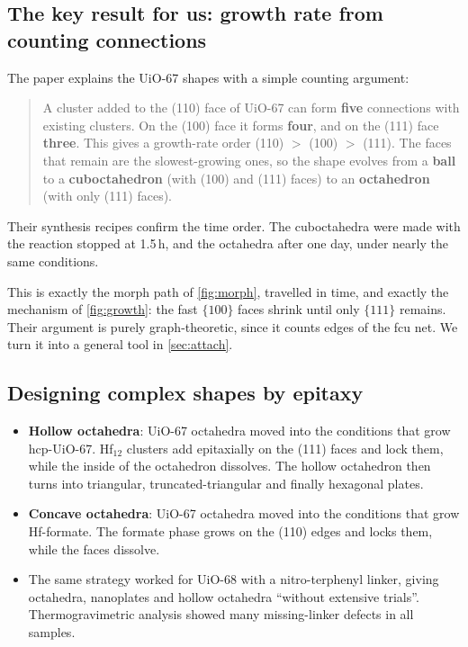 \documentclass[11pt,a4paper]{article}
\theoremstyle{remark}\newtheorem*{example}{Worked example}
\begin{document}
\subsection{The key result for us: growth rate from counting connections}
The paper explains the UiO-67 shapes with a simple counting argument:
\begin{quote}
A cluster added to the (110) face of UiO-67 can form \textbf{five} connections with existing clusters. On the (100) face it forms \textbf{four}, and on the (111) face \textbf{three}. This gives a growth-rate order (110) $>$ (100) $>$ (111). The faces that remain are the slowest-growing ones, so the shape evolves from a \textbf{ball} to a \textbf{cuboctahedron} (with (100) and (111) faces) to an \textbf{octahedron} (with only (111) faces).
\end{quote}
Their synthesis recipes confirm the time order. The cuboctahedra were made with the reaction stopped at 1.5\,h, and the octahedra after one day, under nearly the same conditions.

\begin{forus}
This is exactly the morph path of \autoref{fig:morph}, travelled in time, and exactly the mechanism of \autoref{fig:growth}: the fast $\{100\}$ faces shrink until only $\{111\}$ remains. Their argument is purely graph-theoretic, since it counts edges of the fcu net. We turn it into a general tool in \autoref{sec:attach}.
\end{forus}

\subsection{Designing complex shapes by epitaxy}
\begin{itemize}
\item \textbf{Hollow octahedra}: UiO-67 octahedra moved into the conditions that grow hcp-UiO-67. Hf$_{12}$ clusters add epitaxially on the (111) faces and lock them, while the inside of the octahedron dissolves. The hollow octahedron then turns into triangular, truncated-triangular and finally hexagonal plates.
\item \textbf{Concave octahedra}: UiO-67 octahedra moved into the conditions that grow Hf-formate. The formate phase grows on the (110) edges and locks them, while the faces dissolve.
\item The same strategy worked for UiO-68 with a nitro-terphenyl linker, giving octahedra, nanoplates and hollow octahedra ``without extensive trials''. Thermogravimetric analysis showed many missing-linker defects in all samples.
\end{itemize}
\end{document}
